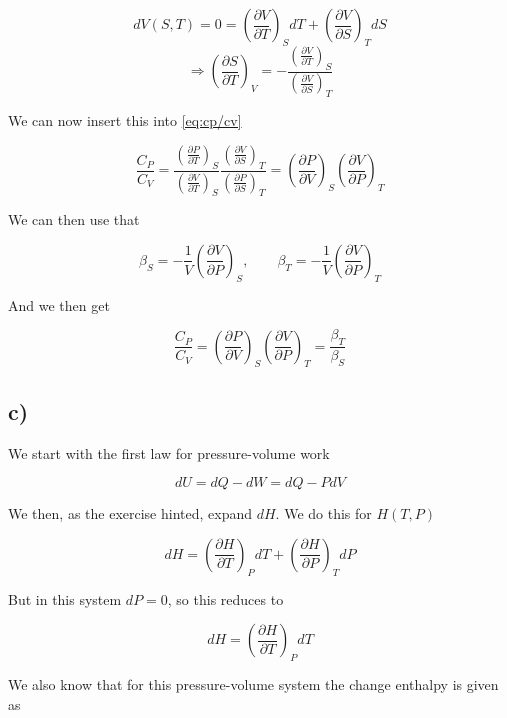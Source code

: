 \documentclass[a4paper,norsk, 10pt]{article}
\newcommand{\pd}[2]{\frac{\partial #1}{\partial #2}}
\begin{document}
\begin{equation}
dV(S,T) = 0 = \left(\pd{V}{T}\right)_S dT + \left(\pd{V}{S}\right)_T dS
\end{equation}
\begin{equation}
\Rightarrow\left(\pd{S}{T}\right)_V = -\frac{\left(\pd{V}{T}\right)_S}{\left(\pd{V}{S}\right)_T}
\end{equation}

We can now insert this into \eqref{eq:cp/cv}

\begin{equation}
\frac{C_P}{C_V} = \frac{\left(\pd{P}{T}\right)_S}{\left(\pd{V}{T}\right)_S}\frac{\left(\pd{V}{S}\right)_T}{\left(\pd{P}{S}\right)_T} =
\left(\pd{P}{V}\right)_S \left(\pd{V}{P}\right)_T
\end{equation}

We can then use that

\begin{equation}
\beta_S = -\frac{1}{V}\left(\pd{V}{P}\right)_S, \qquad \beta_T = -\frac{1}{V}\left(\pd{V}{P}\right)_T
\end{equation}

And we then get

\begin{equation}
\frac{C_P}{C_V} = \left(\pd{P}{V}\right)_S \left(\pd{V}{P}\right)_T = \frac{\beta_T}{\beta_S}
\end{equation}

\subsection{c)}
We start with the first law for pressure-volume work

\begin{equation}
dU = dQ - dW = dQ - PdV
\label{eq:firstLaw}
\end{equation}

We then, as the exercise hinted, expand $dH$. We do this for $H(T,P)$

\begin{equation}
dH = \left(\pd{H}{T}\right)_P dT + \left(\pd{H}{P}\right)_T dP
\end{equation}

But in this system $dP = 0$, so this reduces to

\begin{equation}
dH = \left(\pd{H}{T}\right)_P dT
\end{equation}

We also know that for this pressure-volume system the change enthalpy is given as
\end{document}
